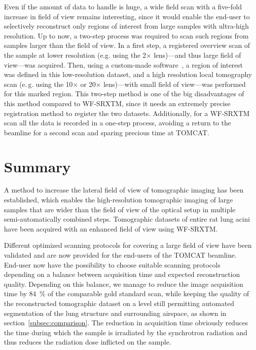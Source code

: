 \documentclass[preprint,s]{iucr}
\newcommand{\eg}{e.\,g. }
\begin{document}
Even if the amount of data to handle is huge, a wide field scan with a five-fold increase in field of view remains interesting, since it would enable the end-user to selectively reconstruct only regions of interest from large samples with ultra-high resolution. Up to now, a two-step process was required to scan such regions from samples larger than the field of view. In a first step, a registered overview scan of the sample at lower resolution (e.g. using the 2$\times$ lens)---and thus large field of view---was acquired. Then, using a custom-made software~\cite{Heinzer2008}, a region of interest was defined in this low-resolution dataset, and a high resolution local tomography scan (\eg using the 10$\times$ or 20$\times$ lens)---with small field of view---was performed for this marked region. This two-step method is one of the big disadvantages of this method compared to WF-SRXTM, since it needs an extremely precise registration method to register the two datasets. Additionally, for a WF-SRXTM scan all the data is recorded in a one-step process, avoiding a return to the beamline for a second scan and sparing precious time at TOMCAT.
\section{Summary}\label{summary}
A method to increase the lateral field of view of tomographic imaging has been established, which enables the high-resolution tomographic imaging of large samples that are wider than the field of view of the optical setup in multiple semi-automatically combined steps. Tomographic datasets of entire rat lung acini have been acquired with an enhanced field of view using WF-SRXTM.

Different optimized scanning protocols for covering a large field of view have been validated and are now provided for the end-users of the TOMCAT beamline. End-user now have the possibility to choose suitable scanning protocols depending on a balance between acquisition time and expected reconstruction quality. Depending on this balance, we manage to reduce the image acquisition time by \SI{84}{\percent} of the comparable gold standard scan, while keeping the quality of the reconstructed tomographic dataset on a level still permitting automated segmentation of the lung structure and surrounding airspace, as shown in section~\ref{subsec:comparison}. The reduction in acquisition time obviously reduces the time during which the sample is irradiated by the synchrotron radiation and thus reduces the radiation dose inflicted on the sample.

\let\oldharvardurl=\harvardurl
\renewcommand{\harvardurl}[1]{\relax}
\let\harvardurl=\oldharvardurl
\end{document}
